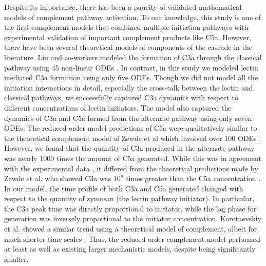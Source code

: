 \documentclass[12pt]{article}
\begin{document}
Despite its importance, there has been a paucity of validated mathematical models of complement pathway activation.
To our knowledge, this study is one of the first complement models that combined multiple initiation pathways with experimental validation of important complement products like C5a.
However, there have been several theoretical models of components of the cascade in the literature.
Liu and co-workers modeled the formation of C3a through the classical pathway using 45 non-linear ODEs  \cite{liu2011computational}.
In contrast, in this study we modeled lectin mediated C3a formation using only five ODEs.
Though we did not model all the initiation interactions in detail, especially the cross-talk between the lectin and classical pathways,
we successfully captured C3a dynamics with respect to different concentrations of lectin initiators.
The model also captured the dynamics of C3a and C5a formed from the alternate pathway using only seven ODEs.
The reduced order model predictions of C5a were qualitatively similar to the theoretical complement model of Zewde et al which involved over 100 ODEs \cite{zewde2016quantitative}.
However, we found that the quantity of C3a produced in the alternate pathway was nearly 1000 times the amount of C5a generated.
While this was in agreement with the experimental data \cite{morad2015time},
it differed from the theoretical predictions made by Zewde et al. who showed C3a was ${10^8}$ times greater than the C5a concentration \cite{zewde2016quantitative}.
In our model, the time profile of both C3a and C5a generated changed with respect to the quantity of zymosan (the lectin pathway initiator).
In particular, the C3a peak time was directly proportional to initiator, while the lag phase for generation was inversely proportional to the initiator concentration.
Korotaevskiy et al. showed a similar trend using a theoretical model of complement, albeit for much shorter time scales \cite{korotaevskiy2009non}.
Thus, the reduced order complement model performed at least as well as existing larger mechanistic models, despite being significantly smaller.
\end{document}

